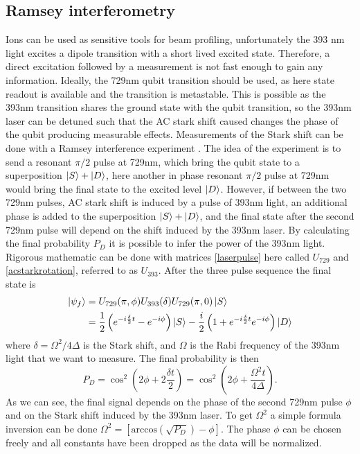 \subsection{Ramsey interferometry}
Ions can be used as sensitive tools for beam profiling, unfortunately the 393 nm light excites a dipole transition with a short lived excited state. Therefore, a direct excitation followed by a measurement is not fast enough to gain any information. Ideally, the 729nm qubit transition should be used, as here state readout is available and the transition is metastable. This is possible as the 393nm transition shares the ground state with the qubit transition, so the 393nm laser can be detuned such that the AC stark shift caused changes the phase of the qubit producing measurable effects. Measurements of the Stark shift can be done with a Ramsey interference experiment \cite{starkshift}.
The idea of the experiment is to send a resonant $\pi/2$ pulse at 729nm, which bring the qubit state to a superposition $\ket{S}+\ket{D}$, here another in phase resonant $\pi/2$ pulse at 729nm would bring the final state to the excited level $\ket{D}$. However, if between the two 729nm pulses, AC stark shift is induced by a pulse of 393nm light, an additional phase is added to the superposition $\ket{S}+\ket{D}$, and the final state after the second 729nm pulse will depend on the shift induced by the 393nm laser. By calculating the final probability $P_D$ it is possible to infer the power of the 393nm light. Rigorous mathematic can be done with matrices \eqref{laserpulse} here called $U_{729}$ and \eqref{acstarkrotation}, referred to as $U_{393}$. After the three pulse sequence the final state is
\begin{equation}
\begin{split}
\ket{\psi_f} &= U_{729}(\pi,\phi)U_{393}(\delta)U_{729}(\pi,0)\ket{S} \\
&= \frac{1}{2}\left(e^{-i\frac{\delta}{2}t}-e^{-i\phi}\right)\ket{S}-\frac{i}{2}\left(1 + e^{-i\frac{\delta}{2}t} e^{-i\phi}\right)\ket{D}
\end{split}
\end{equation}
where $\delta = \Omega^2/4\Delta$ is the Stark shift, and $\Omega$ is the Rabi frequency of the 393nm light that we want to measure. The final probability is then
\begin{equation}
P_D = \cos^2\left(2\phi + 2\frac{\delta t}{2}\right) = \cos^2\left(2\phi + \frac{\Omega^2 t}{4\Delta}\right).
\end{equation}
As we can see, the final signal depends on the phase of the second 729nm pulse $\phi$ and on the Stark shift induced by the 393nm laser. To get $\Omega^2$ a simple formula inversion can be done $\Omega^2 = \left[\text{arccos}\left(\sqrt{P_D}\right)-\phi \right]$. The phase $\phi$ can be chosen freely and all constants have been dropped as the data will be normalized.
